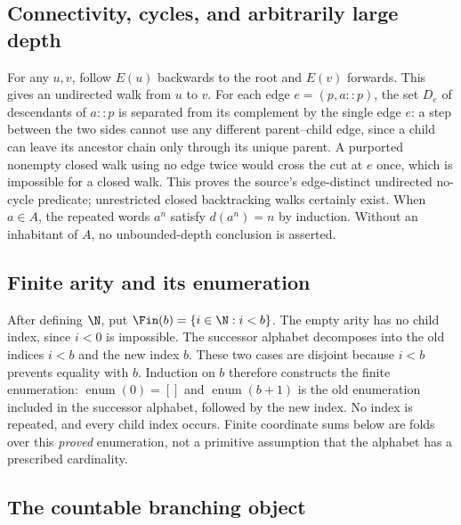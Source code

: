 \subsection{Connectivity, cycles, and arbitrarily large depth}\label{supp:2-3}
\par{}\par\smallskip

For any $u,v$, follow $E(u)$ backwards to the root and $E(v)$ forwards. This gives an undirected walk from $u$ to $v$. For each edge $e=(p,a::p)$, the set $D_e$ of descendants of $a::p$ is separated from its complement by the single edge $e$: a step between the two sides cannot use any different parent--child edge, since a child can leave its ancestor chain only through its unique parent. A purported nonempty closed walk using no edge twice would cross the cut at $e$ once, which is impossible for a closed walk. This proves the source's edge-distinct undirected no-cycle predicate; unrestricted closed backtracking walks certainly exist. When $a\in A$, the repeated words $a^n$ satisfy $d(a^n)=n$ by induction. Without an inhabitant of $A$, no unbounded-depth conclusion is asserted.

\subsection{Finite arity and its enumeration}\label{supp:2-4}
\par{}\par\smallskip

After defining $\N$, put $\Fin(b)=\{i\in\N:i<b\}$. The empty arity has no child index, since $i<0$ is impossible. The successor alphabet decomposes into the old indices $i<b$ and the new index $b$. These two cases are disjoint because $i<b$ prevents equality with $b$. Induction on $b$ therefore constructs the finite enumeration: $\operatorname{enum}(0)=[]$ and $\operatorname{enum}(b+1)$ is the old enumeration included in the successor alphabet, followed by the new index. No index is repeated, and every child index occurs. Finite coordinate sums below are folds over this \emph{proved} enumeration, not a primitive assumption that the alphabet has a prescribed cardinality.

\subsection{The countable branching object}\label{supp:2-5}
\par{}\par\smallskip


